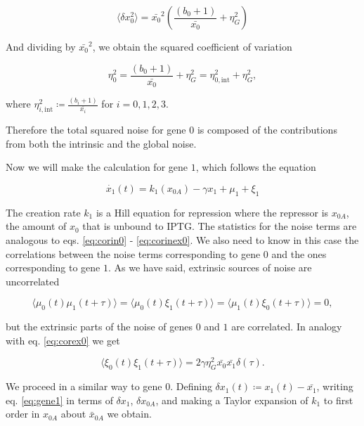 \begin{equation*}
\langle \delta x_0^2 \rangle = \bar{x_0}^2\left(\frac{(b_0+1)}{\bar{x_0}}+ \eta_G^2\right)
\end{equation*}

And dividing by $\bar{x_0}^2$, we obtain the squared coefficient of variation

\begin{equation}
  \label{eq:etagene0}
  \boxed{\eta_0^2 = \frac{(b_0+1)}{\bar{x_0}}+ \eta_G^2 = \eta_{0,\text{int}}^2+\eta_G^2},
\end{equation}

where $\eta_{i,\text{int}}^2\coloneqq\frac{(b_i+1)}{\bar{x_i}}$ for $i=0,1,2,3$.

Therefore the total squared noise for gene $0$ is composed of the contributions from both the intrinsic and the global noise.

Now we will make the calculation for gene $1$, which follows the equation

\begin{equation}
\label{eq:gene1}
\dot{x_1}(t) = k_1(x_{0A})-\gamma x_1+\mu_1+\xi_1
\end{equation}

The creation rate $k_1$ is a Hill equation for repression where the repressor is $x_{0A}$, the amount of $x_0$ that is unbound to IPTG. The statistics for the noise terms are analogous to eqs. \eqref{eq:corin0} - \eqref{eq:corinex0}. We also need to know in this case the correlations between the noise terms corresponding to gene $0$ and the ones corresponding to gene $1$. As we have said, extrinsic sources of noise are uncorrelated

\begin{equation}
\label{eq:corcross01}
\langle\mu_0(t)\mu_1(t+\tau)\rangle = \langle\mu_0(t)\xi_1(t+\tau)\rangle = \langle\mu_1(t)\xi_0(t+\tau)\rangle = 0,
\end{equation}

but the extrinsic parts of the noise of genes $0$ and $1$ are correlated. In analogy with eq. \eqref{eq:corex0} we get

\begin{equation}
  \langle\xi_0(t)\xi_1(t+\tau)\rangle = 2\gamma\eta_G^2\bar{x_0}\bar{x_1}\delta(\tau).
\end{equation}


We proceed in a similar way to gene $0$. Defining $\delta x_1(t) \coloneqq x_1(t) - \bar{x_1}$, writing eq. \eqref{eq:gene1} in terms of $\delta x_1$, $\delta x_{0A}$, and making a Taylor expansion of $k_1$ to first order in $x_{0A}$ about $\bar{x}_{0A}$ we obtain.

